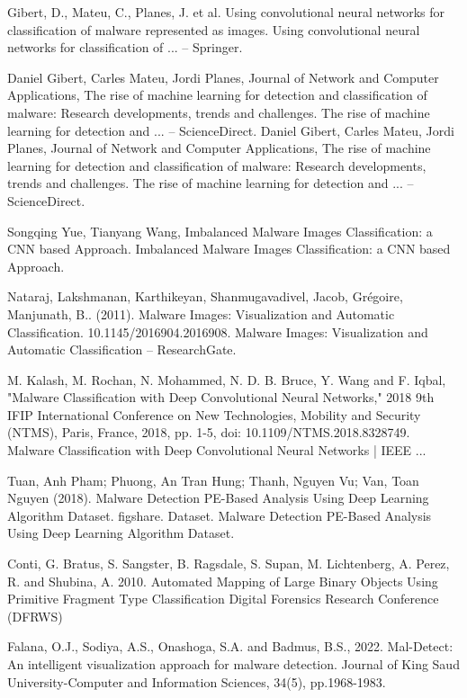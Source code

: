 \documentclass[conference]{IEEEtran}
\begin{document}
    
\begin{thebibliography}{00}
 Gibert, D., Mateu, C., Planes, J. et al. Using convolutional neural networks for classification of malware represented as
images. Using convolutional neural networks for classification of ... – Springer.

Daniel Gibert, Carles Mateu, Jordi Planes, Journal of Network and Computer Applications, The rise of machine learning for detection and classification of malware: Research developments, trends and challenges. The rise of machine learning for detection and ... – ScienceDirect.
Daniel Gibert, Carles Mateu, Jordi Planes, Journal of Network and Computer Applications, The rise of machine learning for detection and classification of malware: Research developments, trends and challenges. The rise of machine learning for detection and ... – ScienceDirect.

Songqing Yue, Tianyang Wang, Imbalanced Malware Images Classification: a CNN based Approach. Imbalanced Malware
Images Classification: a CNN based Approach.

Nataraj, Lakshmanan, Karthikeyan, Shanmugavadivel, Jacob, Grégoire, Manjunath, B.. (2011). Malware Images: Visualization and Automatic Classification. 10.1145/2016904.2016908. Malware Images: Visualization and Automatic Classification – ResearchGate.

M. Kalash, M. Rochan, N. Mohammed, N. D. B. Bruce, Y. Wang and F. Iqbal, "Malware Classification with Deep Convolutional Neural Networks," 2018 9th IFIP International Conference on New Technologies, Mobility and Security (NTMS), Paris, France, 2018, pp. 1-5, doi: 10.1109/NTMS.2018.8328749. Malware Classification with Deep Convolutional Neural Networks | IEEE ...

 Tuan, Anh Pham; Phuong, An Tran Hung; Thanh, Nguyen Vu; Van, Toan Nguyen (2018). Malware Detection PE-Based Analysis Using Deep Learning Algorithm Dataset. figshare. Dataset. Malware Detection PE-Based Analysis Using Deep Learning Algorithm Dataset.

 Conti, G. Bratus, S. Sangster, B. Ragsdale, S. Supan, M.
Lichtenberg, A. Perez, R. and Shubina, A. 2010. Automated
Mapping of Large Binary Objects Using Primitive Fragment Type
Classification Digital Forensics Research Conference (DFRWS)

 Falana, O.J., Sodiya, A.S., Onashoga, S.A. and Badmus, B.S., 2022. Mal-Detect: An intelligent visualization approach for malware detection. Journal of King Saud University-Computer and Information Sciences, 34(5), pp.1968-1983.


\end{thebibliography}
\end{document}
